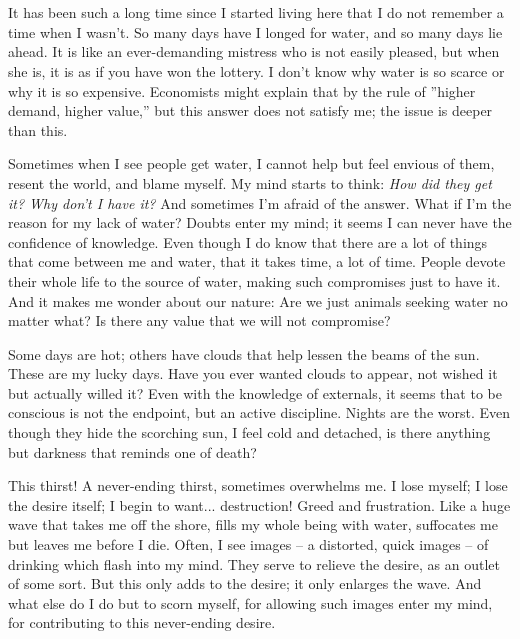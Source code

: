 \documentclass[12pt, a4paper]{article}
\begin{document}
\section*{\centering{}}
\vspace{0.5cm}

It has been such a long time since I started living here
that I do not remember a time when I wasn't. So many days
have I longed for water, and so many days lie ahead. It is like
an ever-demanding mistress who is not easily pleased, but when
she is, it is as if you have won the lottery. I don't know 
why water is so scarce or why it is so expensive. Economists
might explain that by the rule of ''higher demand, higher value,''
but this answer does not satisfy me; the issue is deeper than this.

Sometimes when I see people get water, I cannot help but feel
envious of them, resent the world, and blame myself. My mind starts
to think: \textit{How did they get it? Why don't I have it?} And 
sometimes I'm afraid of the answer. What if I'm the reason for
my lack of water? Doubts enter my mind; it seems I can never
have the confidence of knowledge. Even though I do know that 
there are a lot of things that come between me and water, that 
it takes time, a lot of time. People devote their whole life
to the source of water, making such compromises just to
have it. And it makes me wonder about our nature: Are we just animals seeking
water no matter what? Is there any value that we will not compromise?

Some days are hot; others have clouds that
help lessen the beams of the sun. These are my lucky days. 
Have you ever wanted clouds to appear, not wished it but 
actually willed it? Even with the knowledge
of externals, it seems that to be conscious is not the endpoint, 
but an active discipline. Nights are the worst. Even though they hide the scorching
sun, I feel cold and detached, is there anything but darkness that reminds one of death?

This thirst! A never-ending thirst, sometimes overwhelms me.
I lose myself; I lose the desire itself; I begin to want... destruction!
Greed and frustration. Like a huge wave that takes me off the shore, 
fills my whole being with water, suffocates me but leaves me before I die.
Often, I see images -- a distorted, quick images -- of drinking which flash into my
mind. They serve to relieve the desire, as an outlet of some sort. But this only adds to 
the desire; it only enlarges the wave. And what else do I do but to scorn myself, for
allowing such images enter my mind, for contributing to this never-ending desire.
\end{document}
